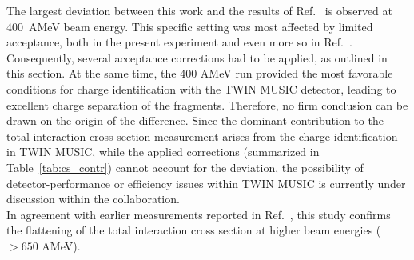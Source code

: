 The largest deviation between this work and the results of Ref.~\cite{ponnath2024measurement} is observed at 400~AMeV beam energy. This specific setting was most affected by limited acceptance, both in the present experiment and even more so in Ref.~\cite{ponnath2024measurement}. 
Consequently, several acceptance corrections had to be applied, as outlined in this section. At the same time, the 400 AMeV run provided the most favorable conditions for charge identification with the TWIN MUSIC detector, leading to excellent charge separation of the fragments. Therefore, no firm conclusion can be drawn on the origin of the difference.
Since the dominant contribution to the total interaction cross section measurement arises from the charge identification in TWIN MUSIC, while the applied corrections (summarized in Table~\ref{tab:cs_contr}) cannot account for the deviation, the possibility of detector-performance or efficiency issues within TWIN MUSIC is currently under discussion within the collaboration.\\
In agreement with earlier measurements reported in Ref.~\cite{ponnath2024measurement}, this study confirms the flattening of the total interaction cross section at higher beam energies ($ > 650$ AMeV).
